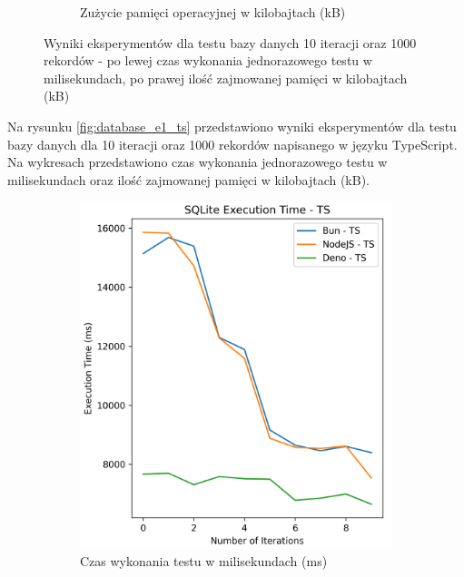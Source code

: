 \begin{figure}[H]
\begin{subfigure}[b]{0.42\textwidth}
    \caption{Zużycie pamięci operacyjnej w kilobajtach (kB)}
    \label{fig:database_e1_js_memory}
  \end{subfigure}
  \caption{Wyniki eksperymentów dla testu bazy danych 10 iteracji oraz 1000 rekordów - po lewej czas wykonania jednorazowego testu w milisekundach, po prawej ilość zajmowanej pamięci w kilobajtach (kB)}
  \label{fig:database_e1_js}
\end{figure}

Na rysunku \ref{fig:database_e1_ts} przedstawiono wyniki eksperymentów dla testu bazy danych dla 10 iteracji oraz 1000 rekordów napisanego w języku TypeScript. Na wykresach przedstawiono czas wykonania jednorazowego testu w milisekundach oraz ilość zajmowanej pamięci w kilobajtach (kB).

\begin{figure}[H]
  \centering
  \begin{subfigure}[b]{0.42\textwidth}
    \centering
    \includegraphics[width=\textwidth]{Figures/database/sqlite_10_1000_ts_time.png}
    \caption{Czas wykonania testu w milisekundach (ms)}
    \label{fig:database_e1_ts_time}
  \end{subfigure}
  \begin{subfigure}[b]{0.42\textwidth}

\end{subfigure}
\end{figure}
